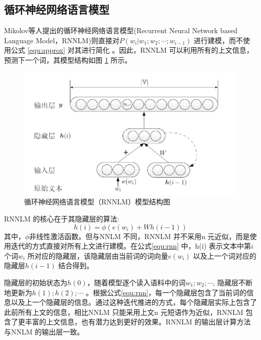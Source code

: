 \documentclass[12pt,a4paper]{article}
\begin{document}
\subsection{循环神经网络语言模型}
Mikolov等人提出的循环神经网络语言模型(Recurrent Neural Network based Language Model，RNNLM)则直接对$P(w_i | w_1;w_2;\cdots;w_{i-1}) $ 进行建模，而不使用公式 \ref{equ:approx} 对其进行简化\cite{mikolov2012statistical,DBLP:conf/interspeech/MikolovKBCK10} 。因此，RNNLM 可以利用所有的上文信息，预测下一个词，其模型结构如图 \ref{fig:rnnlm} 所示。

\begin{figure}
  \centering
  \includegraphics[width=0.85\linewidth]{./figures/rnnlm.png}
  \caption{循环神经网络语言模型（RNNLM）模型结构图}\label{fig:rnnlm}
\end{figure}

RNNLM 的核心在于其隐藏层的算法:
\begin{equation}
\label{equ:rnn}
h(i) =\phi(e(w_i) +Wh(i -1))
\end{equation}
其中，$\phi$非线性激活函数。但与NNLM 不同，RNNLM 并不采用n 元近似，而是使用迭代的方式直接对所有上文进行建模。在公式\ref{equ:rnn} 中，h(i) 表示文本中第$i$ 个词$w_i$ 所对应的隐藏层，该隐藏层由当前词的词向量$e(w_i)$ 以及上一个词对应的隐藏层$h(i -1)$ 结合得到。

隐藏层的初始状态为$h(0)$，随着模型逐个读入语料中的词$w_1;w_2; \cdots $, 隐藏层不断地更新为$h(1);h(2); \cdots$ 。根据公式\ref{equ:rnn}，每一个隐藏层包含了当前词的信息以及上一个隐藏层的信息。通过这种迭代推进的方式，每个隐藏层实际上包含了此前所有上文的信息，相比NNLM 只能采用上文n 元短语作为近似，RNNLM 包含了更丰富的上文信息，也有潜力达到更好的效果。RNNLM 的输出层计算方法与NNLM 的输出层一致。
\end{document}
